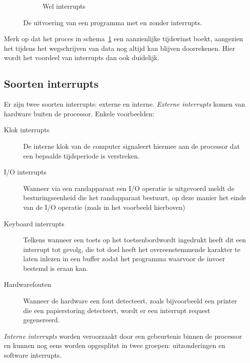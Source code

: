 \begin{figure}
\begin{subfigure}{.5\textwidth}
  \caption{Wel interrupts}
  \label{fig:progflowwithint}
\end{subfigure}
\caption{De uitvoering van een programma met en zonder interrupts.}
\label{fig:intsandnoints}
\end{figure}

Merk op dat het proces in schema~\ref{fig:progflowwithint} een aanzienlijke tijdswinst boekt, aangezien het tijdens het wegschrijven van data nog altijd kan blijven doorrekenen. Hier wordt het voordeel van interrupts dan ook duidelijk.

\subsection{Soorten interrupts}\label{sec:soorten}

Er zijn twee soorten interrupts: externe en interne.
\emph{Externe interrupts} komen van hardware buiten de
processor. Enkele voorbeelden:

\begin{description}
\item[Klok interrupts] De interne klok van de computer signaleert hiermee aan de
processor dat een bepaalde tijdsperiode is verstreken.
\item[I/O interrupts] Wanneer via een randapparaat een I/O operatie is
uitgevoerd meldt de besturingseenheid die het randapparaat
bestuurt, op deze manier het einde van de I/O operatie (zoals in het voorbeeld
hierboven)
\item[Keyboard interrupts] Telkens wanneer een toets op het toetsenbordwordt
ingedrukt heeft dit een interrupt tot gevolg, die tot doel heeft het
overeenstemmende karakter te laten inlezen in een buffer zodat het programma
waarvoor de invoer bestemd is eraan
kan.
\item[Hardwarefouten] Wanneer de hardware een fout detecteert, zoals bijvoorbeeld
 een printer die een papierstoring detecteert, wordt er een interrupt request gegenereerd.
\end{description}

\emph{Interne interrupts} worden veroorzaakt
door een gebeurtenis binnen de processor en kunnen nog eens worden
opgesplitst in twee groepen: uitzonderingen en software
interrupts.

